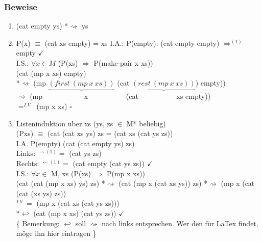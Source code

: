 \documentclass[a4paper, 20pt, openany]{book}
\begin{document}
\subsubsection{Beweise}
\begin{enumerate}
\item (cat empty ys) *$\rightsquigarrow$  ys
\item P(x) $\equiv$ (cat xs empty) = xs
I.A.: P(empty): (cat empty empty) $\Rightarrow^{(1)}$ empty $\checkmark$\\
I.S.: $\forall x \in M$ (P(xs) $\Rightarrow$ P(make-pair x xs))\\
(cat (mp x xs) empty) \\
*$\rightsquigarrow$ (mp $\underbrace{(first\ (mp \ x \ xs))}$ (cat $\underbrace{(rest\ (mp \ x \  xs))}$) empty))\\
$\rightsquigarrow$  (mp \ \ \ \ \  \ \  \ \ \ \  x  \ \ \ \ \ \ \ \ \ \  (cat \ \ \ \ \ \ \ \ \ \ xs empty))\\
$=^{I.V.}$ (mp x xs) $\square$


\item Listeninduktion über xs (ys, zs $\in$ M* beliebig)\\
(Pxs) $\equiv$ (cat (cat xs ys) zs = (cat xs (cat ys zs))\\
I.A. P(empty) (cat (cat empty ys) zs)\\
Links: $^{\rightarrow (1)} =$ (cat ys zs)\\
Rechts: $^{\leftarrow (1)} =$ (cat empty (cat ys zs))  $\checkmark$\\
I.S.: $\forall x \in$ M, xs (P(xs) $\Rightarrow$ P(mp x xs)) \\
(cat (cat (mp x xs) ys) zs) *$\rightsquigarrow$ (cat (mp x (cat xs ys)) zs) *$\rightsquigarrow$ (mp x (cat (cat (xs ys) zs))\\
$^{I.V.} = $ (mp x (cat xs (cat ys zs)))\\
$* \hookleftarrow$ (cat (mp x xs) (cat ys zs)) $\checkmark$\\
\{ Bemerkung: $\hookleftarrow$ soll $\rightsquigarrow$ nach links entsprechen. Wer den für LaTex findet, möge ihn hier eintragen \}
\end{enumerate}
\end{document}
